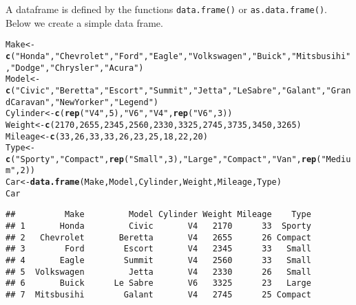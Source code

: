 \documentclass[12pt,A4,makeidx]{article}\usepackage[]{graphicx}\usepackage[]{xcolor}
\makeatletter
\newcommand{\hlnum}[1]{\textcolor[rgb]{0.686,0.059,0.569}{#1}}%
\newcommand{\hlstr}[1]{\textcolor[rgb]{0.192,0.494,0.8}{#1}}%
\newcommand{\hlstd}[1]{\textcolor[rgb]{0.345,0.345,0.345}{#1}}%
\newcommand{\hlkwb}[1]{\textcolor[rgb]{0.69,0.353,0.396}{#1}}%
\newcommand{\hlkwd}[1]{\textcolor[rgb]{0.737,0.353,0.396}{\textbf{#1}}}%
\newenvironment{kframe}{%
 \def\at@end@of@kframe{}%
 \ifinner\ifhmode%
  \def\at@end@of@kframe{\end{minipage}}%
  \begin{minipage}{\columnwidth}%
 \fi\fi%
 \def\FrameCommand##1{\hskip\@totalleftmargin \hskip-\fboxsep
 \colorbox{shadecolor}{##1}\hskip-\fboxsep
     \hskip-\linewidth \hskip-\@totalleftmargin \hskip\columnwidth}%
 \MakeFramed {\advance\hsize-\width
   \@totalleftmargin\z@ \linewidth\hsize
   \@setminipage}}%
 {\par\unskip\endMakeFramed%
 \at@end@of@kframe}
\newenvironment{knitrout}{}{} %
\makeatother
\begin{document}
A dataframe is defined by the functions \texttt{data.frame()} or \texttt{as.data.frame()}. Below we create a 
simple data frame.
\begin{knitrout}
\color{fgcolor}\begin{kframe}
\begin{alltt}
\hlstd{Make}\hlkwb{<-}\hlkwd{c}\hlstd{(}\hlstr{"Honda"}\hlstd{,}\hlstr{"Chevrolet"}\hlstd{,}\hlstr{"Ford"}\hlstd{,}\hlstr{"Eagle"}\hlstd{,}\hlstr{"Volkswagen"}\hlstd{,}\hlstr{"Buick"}\hlstd{,}\hlstr{"Mitsbusihi"}\hlstd{,}\hlstr{"Dodge"}\hlstd{,}\hlstr{"Chrysler"}\hlstd{,}\hlstr{"Acura"}\hlstd{)}
\hlstd{Model}\hlkwb{<-}\hlkwd{c}\hlstd{(}\hlstr{"Civic"}\hlstd{,}\hlstr{"Beretta"}\hlstd{,}\hlstr{"Escort"}\hlstd{,}\hlstr{"Summit"}\hlstd{,}\hlstr{"Jetta"}\hlstd{,}\hlstr{"Le Sabre"}\hlstd{,}\hlstr{"Galant"}\hlstd{,}\hlstr{"Grand Caravan"}\hlstd{,}\hlstr{"New Yorker"}\hlstd{,}\hlstr{"Legend"}\hlstd{)}
\hlstd{Cylinder}\hlkwb{<-}\hlkwd{c}\hlstd{(}\hlkwd{rep}\hlstd{(}\hlstr{"V4"}\hlstd{,}\hlnum{5}\hlstd{),}\hlstr{"V6"}\hlstd{,}\hlstr{"V4"}\hlstd{,}\hlkwd{rep}\hlstd{(}\hlstr{"V6"}\hlstd{,}\hlnum{3}\hlstd{))}
\hlstd{Weight}\hlkwb{<-}\hlkwd{c}\hlstd{(}\hlnum{2170}\hlstd{,}\hlnum{2655}\hlstd{,}\hlnum{2345}\hlstd{,}\hlnum{2560}\hlstd{,}\hlnum{2330}\hlstd{,}\hlnum{3325}\hlstd{,}\hlnum{2745}\hlstd{,}\hlnum{3735}\hlstd{,}\hlnum{3450}\hlstd{,}\hlnum{3265}\hlstd{)}
\hlstd{Mileage}\hlkwb{<-}\hlkwd{c}\hlstd{(}\hlnum{33}\hlstd{,}\hlnum{26}\hlstd{,}\hlnum{33}\hlstd{,}\hlnum{33}\hlstd{,}\hlnum{26}\hlstd{,}\hlnum{23}\hlstd{,}\hlnum{25}\hlstd{,}\hlnum{18}\hlstd{,}\hlnum{22}\hlstd{,}\hlnum{20}\hlstd{)}
\hlstd{Type}\hlkwb{<-}\hlkwd{c}\hlstd{(}\hlstr{"Sporty"}\hlstd{,}\hlstr{"Compact"}\hlstd{,}\hlkwd{rep}\hlstd{(}\hlstr{"Small"}\hlstd{,}\hlnum{3}\hlstd{),}\hlstr{"Large"}\hlstd{,}\hlstr{"Compact"}\hlstd{,}\hlstr{"Van"}\hlstd{,}\hlkwd{rep}\hlstd{(}\hlstr{"Medium"}\hlstd{,}\hlnum{2}\hlstd{))}
\hlstd{Car}\hlkwb{<-}\hlkwd{data.frame}\hlstd{(Make,Model,Cylinder,Weight,Mileage,Type)}
\hlstd{Car}
\end{alltt}
\begin{verbatim}
##          Make         Model Cylinder Weight Mileage    Type
## 1       Honda         Civic       V4   2170      33  Sporty
## 2   Chevrolet       Beretta       V4   2655      26 Compact
## 3        Ford        Escort       V4   2345      33   Small
## 4       Eagle        Summit       V4   2560      33   Small
## 5  Volkswagen         Jetta       V4   2330      26   Small
## 6       Buick      Le Sabre       V6   3325      23   Large
## 7  Mitsbusihi        Galant       V4   2745      25 Compact

\end{verbatim}
\end{kframe}
\end{knitrout}
\end{document}
